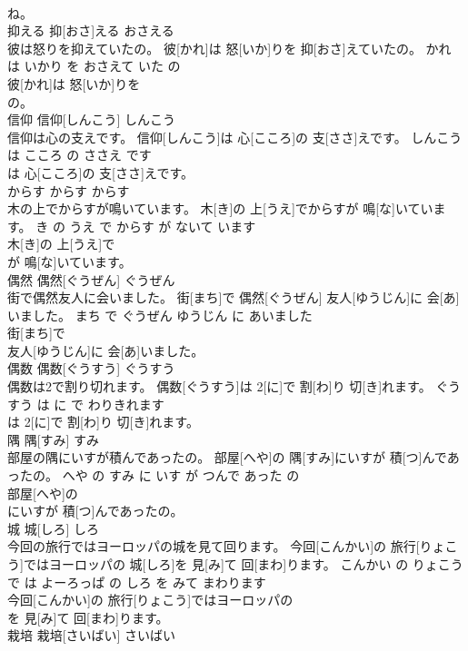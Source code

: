 \documentclass[8pt]{extreport}
\begin{document}
\begin{CJK}{UTF8}{min}
\\	ね。			
\\	抑える	抑[おさ]える	おさえる	
\\	彼は怒りを抑えていたの。	彼[かれ]は 怒[いか]りを 抑[おさ]えていたの。	かれ は いかり を おさえて いた の	
\\	彼[かれ]は 怒[いか]りを
\\	の。			
\\	信仰	信仰[しんこう]	しんこう	
\\	信仰は心の支えです。	信仰[しんこう]は 心[こころ]の 支[ささ]えです。	しんこう は こころ の ささえ です	
\\	は 心[こころ]の 支[ささ]えです。			
\\	からす	からす	からす	
\\	木の上でからすが鳴いています。	木[き]の 上[うえ]でからすが 鳴[な]いています。	き の うえ で からす が ないて います	
\\	木[き]の 上[うえ]で
\\	が 鳴[な]いています。			
\\	偶然	偶然[ぐうぜん]	ぐうぜん	
\\	街で偶然友人に会いました。	街[まち]で 偶然[ぐうぜん] 友人[ゆうじん]に 会[あ]いました。	まち で ぐうぜん ゆうじん に あいました	
\\	街[まち]で
\\	友人[ゆうじん]に 会[あ]いました。			
\\	偶数	偶数[ぐうすう]	ぐうすう	
\\	偶数は2で割り切れます。	偶数[ぐうすう]は 2[に]で 割[わ]り 切[き]れます。	ぐうすう は に で わりきれます	
\\	は 2[に]で 割[わ]り 切[き]れます。			
\\	隅	隅[すみ]	すみ	
\\	部屋の隅にいすが積んであったの。	部屋[へや]の 隅[すみ]にいすが 積[つ]んであったの。	へや の すみ に いす が つんで あった の	
\\	部屋[へや]の
\\	にいすが 積[つ]んであったの。			
\\	城	城[しろ]	しろ	
\\	今回の旅行ではヨーロッパの城を見て回ります。	今回[こんかい]の 旅行[りょこう]ではヨーロッパの 城[しろ]を 見[み]て 回[まわ]ります。	こんかい の りょこう で は よーろっぱ の しろ を みて まわります	
\\	今回[こんかい]の 旅行[りょこう]ではヨーロッパの
\\	を 見[み]て 回[まわ]ります。			
\\	栽培	栽培[さいばい]	さいばい	

\end{CJK}
\end{document}
